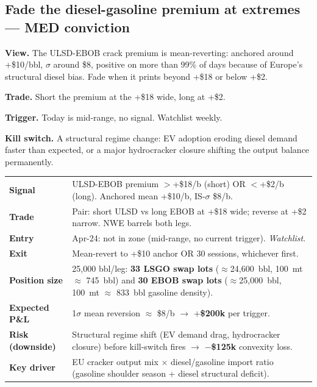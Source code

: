 \documentclass[10pt,a4paper]{article}
\begin{document}
\subsection{Fade the diesel-gasoline premium at extremes --- MED conviction}

\textbf{View.} The ULSD-EBOB crack premium is mean-reverting: anchored around +\$10/bbl, $\sigma$ around \$8, positive on more than 99\% of days because of Europe's structural diesel bias. Fade when it prints beyond +\$18 or below +\$2.

\textbf{Trade.} Short the premium at the +\$18 wide, long at +\$2.

\textbf{Trigger.} Today is mid-range, no signal. Watchlist weekly.

\textbf{Kill switch.} A structural regime change: EV adoption eroding diesel demand faster than expected, or a major hydrocracker closure shifting the output balance permanently.

\begin{redbox}
\setlength{\tabcolsep}{4pt}
\renewcommand{\arraystretch}{1.15}
\begin{tabular}{@{}p{}p{}@{}}
\textbf{Signal}            & ULSD-EBOB premium $>$+\$18/b (short) OR $<$+\$2/b (long). Anchored mean +\$10/b, IS-$\sigma$ \$8/b. \\
\textbf{Trade}             & Pair: short ULSD vs long EBOB at +\$18 wide; reverse at +\$2 narrow. NWE barrels both legs. \\
\textbf{Entry}             & Apr-24: not in zone (mid-range, no current trigger). \emph{Watchlist}. \\
\textbf{Exit}              & Mean-revert to +\$10 anchor OR 30 sessions, whichever first. \\
\textbf{Position size}     & 25{,}000 bbl/leg: \textbf{33 LSGO swap lots} ($\approx$24{,}600~bbl, 100~mt $\approx$ 745~bbl) and \textbf{30 EBOB swap lots} ($\approx$25{,}000~bbl, 100~mt $\approx$ 833~bbl gasoline density). \\
\textbf{Expected P\&L}     & 1$\sigma$ mean reversion $\approx$ \$8/b $\rightarrow$ \textbf{$+$\$200k} per trigger. \\
\textbf{Risk (downside)}   & Structural regime shift (EV demand drag, hydrocracker closure) before kill-switch fires $\rightarrow$ \textbf{$-$\$125k} convexity loss. \\
\textbf{Key driver}        & EU cracker output mix $\times$ diesel/gasoline import ratio (gasoline shoulder season + diesel structural deficit). \\
\end{tabular}
\end{redbox}
\end{document}
